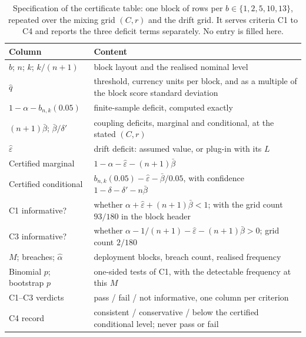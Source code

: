 \documentclass[../../../main.tex]{subfiles}
\begin{document}
\begin{table}[htbp]
\centering\small
\caption{Specification of the certificate table: one block of rows per $b\in\{1,2,5,10,13\}$, repeated over the mixing grid $(C,r)$ and the drift grid. It serves criteria C1 to C4 and reports the three deficit terms separately. No entry is filled here.}
\label{tab:usd-cert}
\begin{tabular}{@{}ll@{}}
\toprule
Column & Content \\
\midrule
$b$; $n$; $k$; $k/(n+1)$ & block layout and the realised nominal level \\
$\hat q$ & threshold, currency units per block, and as a multiple of the block score standard deviation \\
$1-\alpha-b_{n,k}(0.05)$ & finite-sample deficit, computed exactly \\
$(n+1)\bar\beta$; $\bar\beta/\delta'$ & coupling deficits, marginal and conditional, at the stated $(C,r)$ \\
$\hat\varepsilon$ & drift deficit: assumed value, or plug-in with its $L$ \\
Certified marginal & $1-\alpha-\hat\varepsilon-(n+1)\bar\beta$ \\
Certified conditional & $b_{n,k}(0.05)-\hat\varepsilon-\bar\beta/0.05$, with confidence $1-\delta-\delta'-n\bar\beta$ \\
C1 informative? & whether $\alpha+\hat\varepsilon+(n+1)\bar\beta<1$; with the grid count $93/180$ in the block header \\
C3 informative? & whether $\alpha-1/(n+1)-\hat\varepsilon-(n+1)\bar\beta>0$; grid count $2/180$ \\
$M$; breaches; $\hat\alpha$ & deployment blocks, breach count, realised frequency \\
Binomial $p$; bootstrap $p$ & one-sided tests of C1, with the detectable frequency at this $M$ \\
C1--C3 verdicts & pass / fail / not informative, one column per criterion \\
C4 record & consistent / conservative / below the certified conditional level; never pass or fail \\
\bottomrule
\end{tabular}
\end{table}
\end{document}
